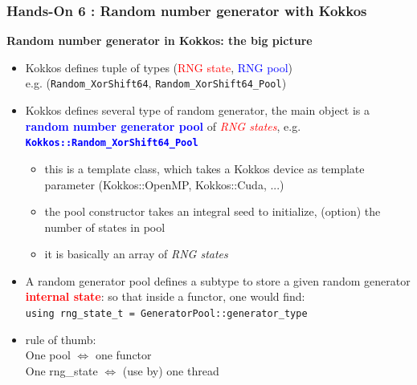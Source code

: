 \begin{frame}[fragile=singleslide]
  \frametitle{Hands-On 6 : Random number generator with Kokkos}

  {\bf \large Random number generator in Kokkos: the big picture}
  \begin{itemize}
  \item Kokkos defines tuple of types (\textcolor{red}{RNG state}, \textcolor{blue}{RNG pool})\\
    e.g. (\texttt{Random\_XorShift64}, \texttt{Random\_XorShift64\_Pool})
  \item Kokkos defines several type of random generator, the main object is a \textcolor{blue}{\bf random number generator pool} of \textcolor{red}{\it RNG states}, e.g. \textcolor{blue}{\bf \texttt{Kokkos::Random\_XorShift64\_Pool}}
    \begin{itemize}
    \item this is a template class, which takes a Kokkos device as template parameter (Kokkos::OpenMP, Kokkos::Cuda, ...)
    \item the pool constructor takes an integral seed to initialize, (option) the number of states in pool
    \item it is basically an array of {\it RNG states}
    \end{itemize}
  \item A random generator pool defines a subtype to store a given random generator \textcolor{red}{\bf internal state}: so that inside a functor, one would find:\\
    \texttt{using rng\_state\_t = GeneratorPool::generator\_type}
  \item rule of thumb:\\
    One pool $\Leftrightarrow$ one functor\\
    One rng\_state $\Leftrightarrow$ (use by) one thread
  \end{itemize}
\end{frame}

